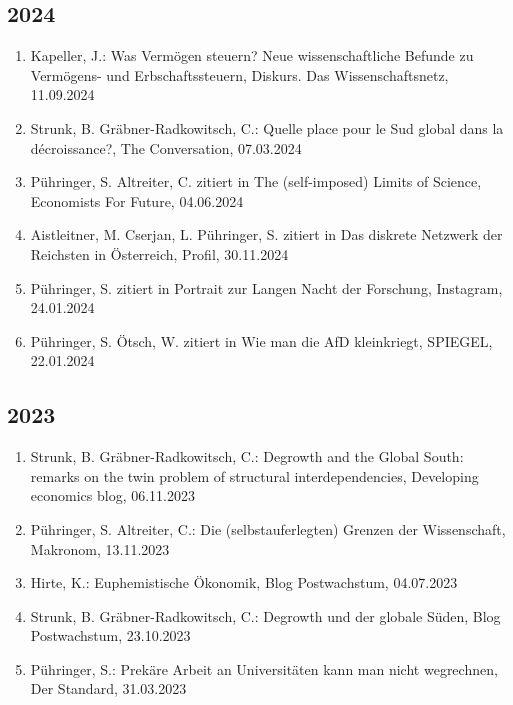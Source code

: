 \subsection*{2024}
\begin{enumerate}
	 \item Kapeller, J.: Was Vermögen steuern? Neue wissenschaftliche Befunde zu Vermögens- und Erbschaftssteuern, Diskurs. Das Wissenschaftsnetz, 11.09.2024
	 \item Strunk, B. Gräbner-Radkowitsch, C.: Quelle place pour le Sud global dans la décroissance?, The Conversation, 07.03.2024
	 \item Pühringer, S. Altreiter, C. zitiert in The (self-imposed) Limits of Science, Economists For Future, 04.06.2024
	 \item Aistleitner, M. Cserjan, L. Pühringer, S. zitiert in Das diskrete Netzwerk der Reichsten in Österreich, Profil, 30.11.2024
	 \item Pühringer, S. zitiert in Portrait zur Langen Nacht der Forschung, Instagram, 24.01.2024
	 \item Pühringer, S. Ötsch, W. zitiert in Wie man die AfD kleinkriegt, SPIEGEL, 22.01.2024
\end{enumerate}
\subsection*{2023}
\begin{enumerate}
	 \item Strunk, B. Gräbner-Radkowitsch, C.: Degrowth and the Global South: remarks on the twin problem of structural interdependencies, Developing economics blog, 06.11.2023
	 \item Pühringer, S. Altreiter, C.: Die (selbstauferlegten) Grenzen der Wissenschaft, Makronom, 13.11.2023
	 \item Hirte, K.: Euphemistische Ökonomik, Blog Postwachstum, 04.07.2023
	 \item Strunk, B. Gräbner-Radkowitsch, C.: Degrowth und der globale Süden, Blog Postwachstum, 23.10.2023
	 \item Pühringer, S.: Prekäre Arbeit an Universitäten kann man nicht wegrechnen, Der Standard, 31.03.2023
\end{enumerate}
